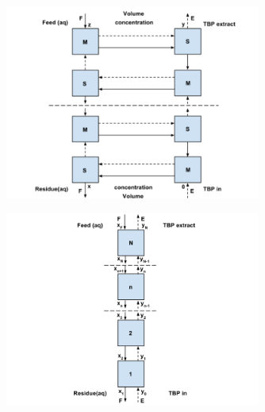 \documentclass[aspectratio=1610,pdftex,dvipsnames,compress,xcolor={dvipsnames}]{beamer}
\begin{document}
\begin{frame}{}
    \begin{figure}
        \centering
        \includegraphics[width=0.75\textwidth]{multistage.jpg}
    \end{figure}
\end{frame}


\begin{frame}{}
    \begin{figure}
        \centering
        \includegraphics[width=0.75\textwidth]{engineering.flow.jpg}
    \end{figure}
\end{frame}
\end{document}
